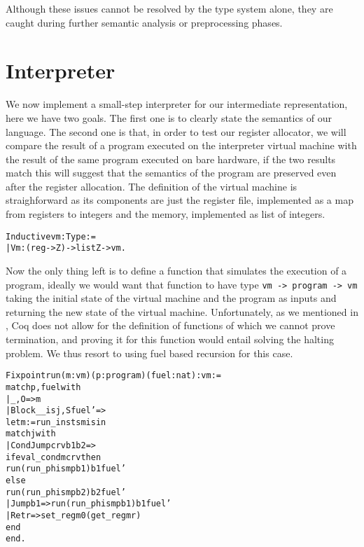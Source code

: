 Although these issues cannot be resolved by the type system alone, they are caught during further semantic analysis or preprocessing phases.

\section{Interpreter}

We now implement a small-step interpreter for our intermediate representation, here we have two goals.
The first one is to clearly state the semantics of our language. The second one is that, in order to test our register allocator, we will compare the result of a program executed on the interpreter virtual machine with the result of the same program executed on bare hardware, if the two results match this will suggest that the semantics of the program are preserved even after the register allocation.
The definition of the virtual machine is straighforward as its components are just the register file, implemented as a map from registers to integers and the memory, implemented as list of integers.

\begin{alltt}
Inductive vm : Type :=
  | Vm : (reg -> Z) -> list Z -> vm.
\end{alltt}

Now the only thing left is to define a function that simulates the execution of a program, ideally we would want that function to have type \texttt{vm -> program -> vm} taking the initial state of the virtual machine and the program as inputs and returning the new state of the virtual machine.
Unfortunately, as we mentioned in , Coq does not allow for the definition of functions of which we cannot prove termination, and proving it for this function would entail solving the halting problem. We thus resort to using fuel based recursion for this case.

\begin{alltt}
Fixpoint run (m : vm) (p : program) (fuel : nat) : vm :=
  match p, fuel with
  | _, O => m
  | Block _ _ is j, S fuel' =>
    let m := run_insts m is in
    match j with
    | CondJump c r v b1 b2 =>
      if eval_cond m c r v then
        run (run_phis m p b1) b1 fuel'
      else
        run (run_phis m p b2) b2 fuel'
    | Jump b1 => run (run_phis m p b1) b1 fuel'
    | Ret r => set_reg m 0 (get_reg m r)
    end
  end.
\end{alltt}

